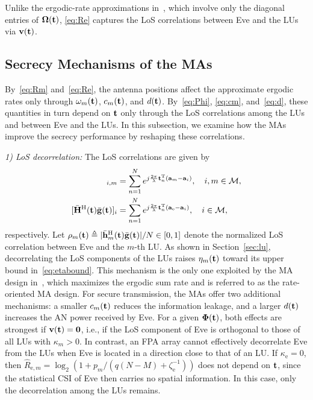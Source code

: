 \documentclass[journal]{IEEEtran}
\newcommand{\rev}[1]{{\color{red}#1}}
\newcommand{\rev}[1]{#1}
\begin{document}
Unlike the ergodic-rate approximations in~\cite{ZhangJSTSP2014,ZhengTCOM2025}, which involve only the diagonal entries of $\boldsymbol{\Omega}(\mathbf{t})$, \eqref{eq:Re} captures the LoS correlations between Eve and the LUs via $\mathbf{v}(\mathbf{t})$.

\subsection{Secrecy Mechanisms of the MAs}\label{sec:insight}

By~\eqref{eq:Rm} and~\eqref{eq:Re}, the antenna positions affect the approximate ergodic rates only through $\omega_m(\mathbf{t})$, $c_m(\mathbf{t})$, and $d(\mathbf{t})$. By~\eqref{eq:Phi}, \eqref{eq:cm}, and~\eqref{eq:d}, these quantities in turn depend on $\mathbf{t}$ only through the LoS correlations among the LUs and between Eve and the LUs. In this subsection, we examine how the MAs improve the secrecy performance by reshaping these correlations.

\textit{1) LoS decorrelation:} The LoS correlations are given by
\begin{align}
[\Hb^{\mathrm H}(\bt)\Hb(\bt)]_{i,m}&=\sum_{n=1}^{N}e^{j\frac{2\pi}{\lambda}\bt_n^{\mathrm T}(\ba_{m}-\ba_i)},\quad i,m\in\mathcal M,\label{eq:corrLU}\\
[\Hb^{\mathrm H}(\bt)\gb(\bt)]_{i}&=\sum_{n=1}^{N}e^{j\frac{2\pi}{\lambda}\bt_n^{\mathrm T}(\ba_{\mathrm e}-\ba_i)},\quad i\in\mathcal M,\label{eq:corrEve}
\end{align}
respectively. Let $\rho_m(\mathbf{t})\triangleq|\bar{\mathbf{h}}_m^{\mathrm H}(\mathbf{t})\bar{\mathbf{g}}(\mathbf{t})|/N\in[0,1]$ denote the normalized LoS correlation between Eve and the $m$-th LU. As shown in Section~\ref{sec:lu}, decorrelating the LoS components of the LUs raises $\eta_m(\mathbf{t})$ toward its upper bound in~\eqref{eq:etabound}. This mechanism is the only one exploited by the MA design in~\cite{ZhengTCOM2025}, which maximizes the ergodic sum rate and is referred to as the rate-oriented MA design. For secure transmission, the MAs offer two additional mechanisms: a smaller $c_m(\mathbf{t})$ reduces the information leakage, and a larger $d(\mathbf{t})$ increases the AN \rev{power} received by Eve. For a given $\boldsymbol{\Phi}(\mathbf{t})$, both effects are strongest if $\mathbf{v}(\mathbf{t})=\mathbf 0$, i.e., if the LoS component of Eve is orthogonal to those of all LUs with $\kappa_m>0$. In contrast, an FPA array cannot effectively decorrelate Eve from the LUs when Eve is located in a direction close to that of an LU. If $\kappa_{\mathrm e}=0$, then $\hat R_{\mathrm{e},m}=\log_2(1+p_m/(q(N-M)+\zeta_{\mathrm e}^{-1}))$ does not depend on $\mathbf{t}$, since the statistical CSI of Eve then carries no spatial information. In this case, only the decorrelation among the LUs remains.
\end{document}

